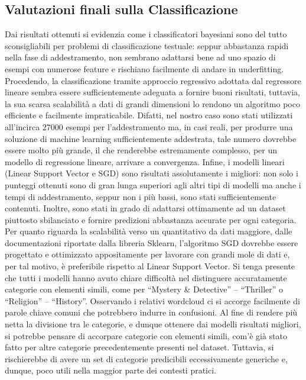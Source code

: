 \documentclass[12pt,oneside]{article}
\begin{document}
    \begin{enumerate}
    \subsection{Valutazioni finali sulla Classificazione}
    \begin{justify}
    Dai risultati ottenuti si evidenzia come i classificatori bayesiani sono del tutto sconsigliabili per problemi di classificazione testuale: seppur abbastanza rapidi nella fase di addestramento, non sembrano adattarsi bene ad uno spazio di esempi con numerose feature e rischiano facilmente di andare in underfitting.
    Procedendo, la classificazione tramite approccio regressivo adottata dal regressore lineare sembra essere sufficientemente adeguata a fornire buoni risultati, tuttavia, la sua scarsa scalabilità a dati di grandi dimensioni lo rendono un algoritmo poco efficiente e facilmente impraticabile. Difatti, nel nostro caso sono stati utilizzati all’incirca 27000 esempi per l’addestramento ma, in casi reali, per produrre una soluzione di machine learning sufficientemente addestrata, tale numero dovrebbe essere molto più grande, il che renderebbe estremamente complesso, per un modello di regressione lineare, arrivare a convergenza.
    Infine, i modelli lineari (Linear Support Vector e SGD) sono risultati assolutamente i migliori: non solo i punteggi ottenuti sono di gran lunga superiori agli altri tipi di modelli ma anche i tempi di addestramento, seppur non i più bassi, sono stati sufficientemente contenuti. Inoltre, sono stati in grado di adattarsi ottimamente ad un dataset piuttosto sbilanciato e fornire predizioni abbastanza accurate per ogni categoria. Per quanto riguarda la scalabilità verso un quantitativo da dati maggiore, dalle documentazioni riportate dalla libreria Sklearn,  l’algoritmo SGD dovrebbe essere progettato e ottimizzato appositamente per lavorare con grandi mole di dati e, per tal motivo, è preferibile rispetto al Linear Support Vector.
    Si tenga presente che tutti i modelli hanno avuto chiare difficoltà nel distinguere accuratamente categorie con elementi simili, come per “Mystery & Detective” – “Thriller” o “Religion” – “History”. Osservando i relativi wordcloud ci si accorge facilmente di parole chiave comuni che potrebbero indurre in confusioni. Al fine di rendere più netta la divisione tra le categorie, e dunque ottenere dai modelli risultati migliori, si potrebbe pensare di accorpare categorie con elementi simili, com’è già stato fatto per altre categorie precedentemente presenti nel dataset. Tuttavia, si rischierebbe di avere un set di categorie predicibili eccessivamente generiche e, dunque, poco utili nella maggior parte dei contesti pratici.
    \end{justify}
    \end{enumerate}
\end{document}
